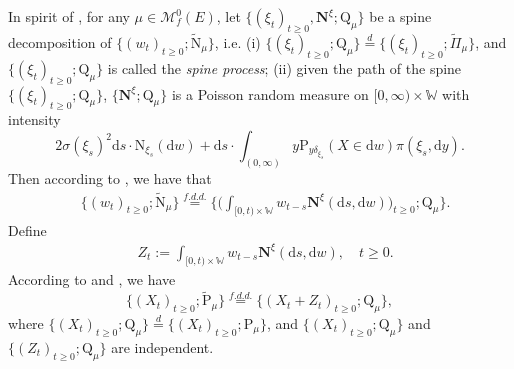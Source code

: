 \documentclass[12pt,a4paper]{amsart}
\numberwithin{equation}{section}
\theoremstyle{plain}
\theoremstyle{definition}
\theoremstyle{remark}
\begin{document}
{\color{gray}
In spirit of \cite{RenSongSun2020Spine}, for any $\mu\in \mathcal M^0_f(E)$, let
$\{(\xi_t)_{t\geq 0}, \mathbf N^\xi; \mathrm Q_\mu\}$ be a spine decomposition of $\{(w_t)_{t\geq 0}; \widetilde {\mathrm N}_\mu\}$, i.e.
(i) $\{(\xi_t)_{t\geq 0}; \mathrm Q_\mu\} \overset{d}= \{(\xi_t)_{t\geq 0}; \widetilde \Pi_{\mu} \}$, and $\{(\xi_t)_{t\geq 0}; \mathrm Q_\mu\}$ is called the {\it spine process};
(ii) given the path of the spine
$\{(\xi_t)_{t\geq 0}; \mathrm Q_\mu\}$,
$\{\mathbf N^\xi; \mathrm Q_\mu\}$ is a Poisson random measure on $[0,\infty) \times \mathbb W$ with intensity
$$
 2 \sigma(\xi_s)^2 \mathrm ds \cdot \mathrm N_{\xi_s}(\mathrm dw)+ \mathrm ds \cdot \int_{(0,\infty)} y \mathrm P_{y\delta_{\xi_s}}(X\in \mathrm dw) \pi(\xi_s, \mathrm dy).
$$
Then according to \cite{RenSongSun2020Spine}, we have that
\begin{align}
 & \{(w_t)_{t\geq 0}; \widetilde{\mathrm N}_\mu \} \overset{{f.d.d.}} = \Big\{ \Big( \int_{[0,t)\times \mathbb W} w_{t-s} \mathbf N^\xi(\mathrm ds, \mathrm dw) \Big)_{t\geq 0} ; \mathrm Q_\mu\Big\}.
 \end{align}
Define\begin{align}
& Z_t:= \int_{[0,t)\times \mathbb W} w_{t-s} \mathbf N^\xi(\mathrm ds, \mathrm dw), \quad t\geq 0.
\end{align}
According to \cite{RenSongSun2020Spine} and \cite{RenSongYang2016Spine},  we have
    \begin{equation}\label{spine-decom1}
    \{(X_t)_{t\geq 0}; \widetilde {\mathrm P}_\mu\} \overset{f.d.d.} = \{ (X_t+ Z_t)_{t\geq 0}; \mathrm Q_\mu\},
    \end{equation}
    where  $\{(X_t)_{t\geq 0}; \mathrm Q_\mu\} \overset{d} =  \{(X_t)_{t\geq 0}; \mathrm P_\mu\}$,   and $\{(X_t)_{t\geq 0}; \mathrm Q_\mu\} $ and $\{(Z_t)_{t\geq 0}; \mathrm Q_\mu\}$ are independent.
    
}
\end{document}
